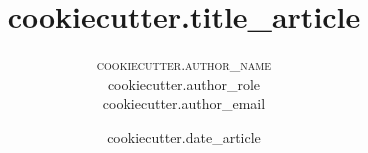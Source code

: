 \setlength{\droptitle}{-4\baselineskip} %

\pretitle{\begin{center}\Huge\bfseries} %
\posttitle{\end{center}} %
\title{
  {{cookiecutter.title_article}}
} %
\author{
\textsc{
	  {{cookiecutter.author_name}}
}\\[1ex] %
\normalsize {{cookiecutter.author_role}} \\
\normalsize {{cookiecutter.author_email}}
}

\date{
  {{cookiecutter.date_article}}
} %

\renewcommand{\maketitlehookd}{
\begin{abstract}
	LaTeX（LATEX，音译“拉泰赫”）是一种基于ΤΕΧ的排版系统，
    由美国计算机学家莱斯利·兰伯特（Leslie Lamport）在20世纪80年代初期开发，
    利用这种格式，即使使用者没有排版和程序设计的知识也可以充分发挥由TeX所提供的强大功能，能在几天、甚至几小时内生成很多具有书籍质量的印刷品。
    对于生成复杂表格和数学公式，这一点表现得尤为突出。因此它非常适用于生成高印刷质量的科技和数学类文档。
    这个系统同样适用于生成从简单的信件到完整书籍的所有其他种类的文档。
\end{abstract}
}


